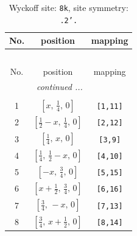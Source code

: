 \documentclass[fleqn,8pt]{jsarticle}
\begin{document}
\begin{longtable}{ccc}
\caption{Wyckoff site: {\tt 8k}, site symmetry: {\tt .2'.}}
 \\
 \hline \hline
No. & position & mapping \\ \hline \endfirsthead

\multicolumn{2}{l}{\tablename\ \thetable{}} \\
 \hline \hline
No. & position & mapping \\ \hline \endhead

 \hline \hline
\multicolumn{2}{r}{\footnotesize\it continued ...} \\ \endfoot

 \hline \hline
\multicolumn{2}{r}{} \\ \endlastfoot

1 & $\left[ x,\, \frac{1}{4},\, 0 \right]$ & {\tt [1,11]} \\ \hline
2 & $\left[ \frac{1}{2} - x,\, \frac{1}{4},\, 0 \right]$ & {\tt [2,12]} \\ \hline
3 & $\left[ \frac{1}{4},\, x,\, 0 \right]$ & {\tt [3,9]} \\ \hline
4 & $\left[ \frac{1}{4},\, \frac{1}{2} - x,\, 0 \right]$ & {\tt [4,10]} \\ \hline
5 & $\left[ - x,\, \frac{3}{4},\, 0 \right]$ & {\tt [5,15]} \\ \hline
6 & $\left[ x + \frac{1}{2},\, \frac{3}{4},\, 0 \right]$ & {\tt [6,16]} \\ \hline
7 & $\left[ \frac{3}{4},\, - x,\, 0 \right]$ & {\tt [7,13]} \\ \hline
8 & $\left[ \frac{3}{4},\, x + \frac{1}{2},\, 0 \right]$ & {\tt [8,14]} \\
\end{longtable}
\renewcommand{\arraystretch}{1.2}
\end{document}
